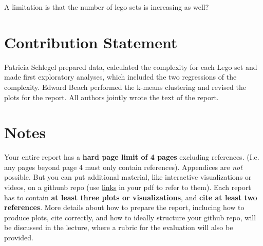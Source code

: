 \documentclass{article}
\theoremstyle{plain}
\theoremstyle{definition}
\theoremstyle{remark}
\begin{document}
A limitation is that the number of lego sets is increasing as well?

\section*{Contribution Statement}

Patricia Schlegel prepared data, calculated the complexity for each Lego set and made first exploratory analyses, which included the two regressions of the complexity. Edward Beach performed the k-means clustering and revised the plots for the report. All authors jointly wrote the text of the report.

\section*{Notes} 

Your entire report has a \textbf{hard page limit of 4 pages} excluding references. (I.e. any pages beyond page 4 must only contain references). Appendices are \emph{not} possible. But you can put additional material, like interactive visualizations or videos, on a githunb repo (use \href{https://github.com/pnkraemer/tueplots}{links} in your pdf to refer to them). Each report has to contain \textbf{at least three plots or visualizations}, and \textbf{cite at least two references}. More details about how to prepare the report, inclucing how to produce plots, cite correctly, and how to ideally structure your github repo, will be discussed in the lecture, where a rubric for the evaluation will also be provided.




\end{document}
